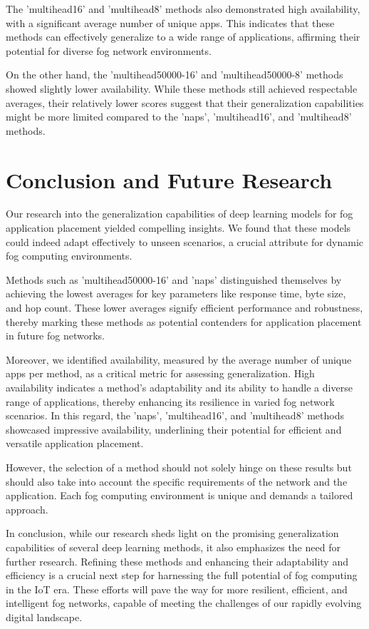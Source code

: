 \documentclass[conference]{IEEEtran}
\begin{document}
The 'multihead16' and 'multihead8' methods also demonstrated high availability, with a significant average number of unique apps. This indicates that these methods can effectively generalize to a wide range of applications, affirming their potential for diverse fog network environments.

On the other hand, the 'multihead50000-16' and 'multihead50000-8' methods showed slightly lower availability. While these methods still achieved respectable averages, their relatively lower scores suggest that their generalization capabilities might be more limited compared to the 'naps', 'multihead16', and 'multihead8' methods.


\section{Conclusion and Future Research}

Our research into the generalization capabilities of deep learning models for fog application placement yielded compelling insights. We found that these models could indeed adapt effectively to unseen scenarios, a crucial attribute for dynamic fog computing environments.

Methods such as 'multihead50000-16' and 'naps' distinguished themselves by achieving the lowest averages for key parameters like response time, byte size, and hop count. These lower averages signify efficient performance and robustness, thereby marking these methods as potential contenders for application placement in future fog networks.

Moreover, we identified availability, measured by the average number of unique apps per method, as a critical metric for assessing generalization. High availability indicates a method's adaptability and its ability to handle a diverse range of applications, thereby enhancing its resilience in varied fog network scenarios. In this regard, the 'naps', 'multihead16', and 'multihead8' methods showcased impressive availability, underlining their potential for efficient and versatile application placement.

However, the selection of a method should not solely hinge on these results but should also take into account the specific requirements of the network and the application. Each fog computing environment is unique and demands a tailored approach.

In conclusion, while our research sheds light on the promising generalization capabilities of several deep learning methods, it also emphasizes the need for further research. Refining these methods and enhancing their adaptability and efficiency is a crucial next step for harnessing the full potential of fog computing in the IoT era. These efforts will pave the way for more resilient, efficient, and intelligent fog networks, capable of meeting the challenges of our rapidly evolving digital landscape.
\end{document}
